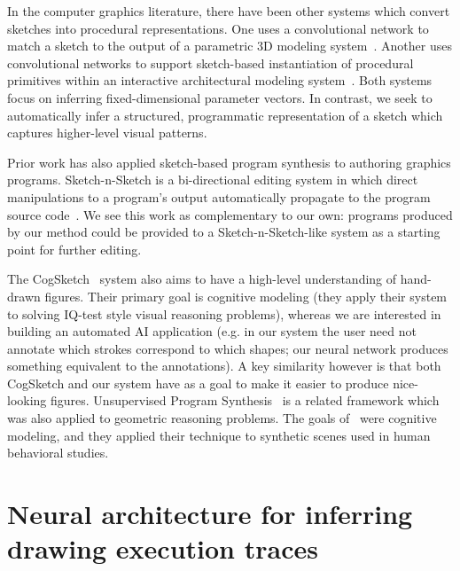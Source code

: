 \documentclass{article}
\begin{document}
In the computer graphics literature, there have been other systems which convert sketches into procedural representations. One uses a convolutional network to match a sketch to the output of a parametric 3D modeling system~\cite{huang2017shape}. Another uses convolutional networks to support sketch-based instantiation of procedural primitives within an interactive architectural modeling system~\cite{Nishida:2016:ISU:2897824.2925951}. Both systems focus on inferring fixed-dimensional parameter vectors. In contrast, we seek to automatically infer a structured, programmatic representation of a sketch which captures higher-level visual patterns.

Prior work has also applied sketch-based program synthesis to authoring graphics programs. Sketch-n-Sketch is a bi-directional editing system in which direct manipulations to a program's output automatically propagate to the program source code~\cite{Hempel:2016:SSP:2984511.2984575}. We see this work as complementary to our own: programs produced by our method could be provided to a Sketch-n-Sketch-like system as a starting point for further editing.

The CogSketch~\cite{forbus2011cogsketch} system also aims to have a
high-level understanding of hand-drawn figures. Their primary goal is
cognitive modeling (they apply their system to solving IQ-test
style visual reasoning problems), whereas we are interested in
building an automated AI application (e.g. in our system the user need
not annotate which strokes correspond to which shapes; our neural
network produces something equivalent to the annotations).  A key
similarity however is that both CogSketch and our system have as a
goal to make it easier to produce nice-looking figures.
Unsupervised Program Synthesis~\cite{ellis2015unsupervised} is a related framework which was also applied to geometric reasoning problems. The goals of~\cite{ellis2015unsupervised} were cognitive modeling,
and they applied their technique to synthetic scenes used in human behavioral studies.





\section{Neural architecture for inferring drawing execution traces}\label{neuralNetworkSection}
\end{document}
